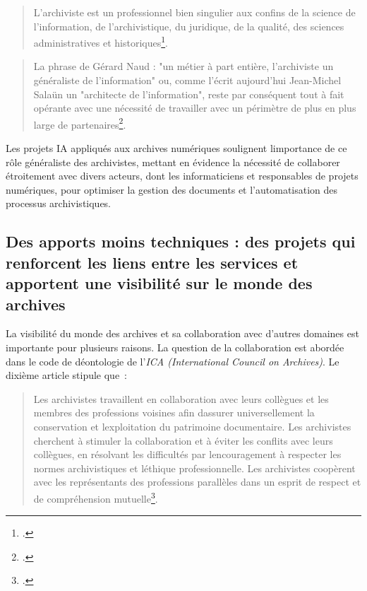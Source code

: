 \begin{quote}
L'archiviste est un professionnel bien
singulier aux confins de la science de l'information, de
l'archivistique, du juridique, de la qualité, des sciences
administratives et historiques\footcite{banat-berger__2012}.
\end{quote}
\begin{quote}
	La phrase de Gérard Naud : "un métier à part entière, l'archiviste un
	généraliste de l'information" ou, comme l'écrit aujourd'hui Jean-Michel
	Salaün un "architecte de l'information", reste par conséquent tout à
	fait opérante avec une nécessité de travailler avec un périmètre de plus
	en plus large de partenaires\footcite{banat-berger__2012}.
\end{quote}

Les projets IA appliqués aux archives numériques soulignent
l\textquotesingle importance de ce rôle généraliste des archivistes,
mettant en évidence la nécessité de collaborer étroitement avec divers
acteurs, dont les informaticiens et responsables de projets numériques, pour optimiser la gestion des
documents et l'automatisation des processus archivistiques.

\subsection{Des apports moins techniques : des projets qui renforcent les liens entre les services et apportent une visibilité sur le monde des archives}

La visibilité du monde des archives et sa collaboration avec d'autres
domaines est importante pour plusieurs raisons. La question de la
collaboration est abordée dans le code de déontologie de l'\emph{ICA (International Council on Archives)}. Le dixième article stipule
que~:

\begin{quote}
	Les archivistes travaillent en collaboration avec leurs collègues et
	les membres des professions voisines afin d\textquotesingle assurer
	universellement la conservation et l\textquotesingle exploitation du
	patrimoine documentaire. Les archivistes cherchent à stimuler la
	collaboration et à éviter les conflits avec leurs collègues, en
	résolvant les difficultés par l\textquotesingle encouragement à
	respecter les normes archivistiques et l\textquotesingle éthique
	professionnelle. Les archivistes coopèrent avec les représentants des
	professions parallèles dans un esprit de respect et de compréhension
	mutuelle\footcite{noauthor_code_nodate}.
\end{quote}


